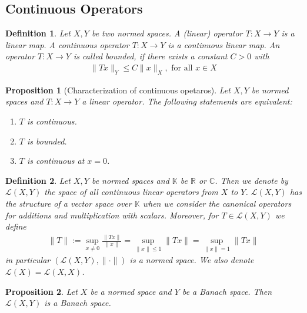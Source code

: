 \documentclass[11pt,a4paper]{article}
\newtheorem{prop}{Proposition}[section]
\newtheorem{defn}{Definition}[section]
\theoremstyle{definition}
\begin{document}
\subsection{Continuous Operators}
\begin{defn} Let $X,Y$ be two normed spaces. A (linear) operator $T: X \to Y$ is a linear map. A continuous operator $T:X \to Y$ is a continuous linear map. An operator $T: X \to Y$ is called bounded, if there exists a constant $C>0$ with 
\begin{align*}
\|Tx\|_Y \leq C \|x \|_X, \text{ for all } x \in X
\end{align*}
\end{defn}
\begin{prop}[Characterization of continuous opetaros] Let $X,Y$ be normed spaces and $T: X \to Y$ a linear operator. The following statements are equivalent:
\begin{enumerate}
\item $T$ is continuous.
\item $T$ is bounded.
\item $T$ is continuous at $x=0$. 
\end{enumerate}
\end{prop}
\begin{defn} Let $X,Y$ be normed spaces and $\mathbb{K}$ be $\mathbb{R}$ or $\mathbb{C}$. Then we denote by $\mathcal{L}(X,Y)$ the space of all continuous linear operators from $X$ to $Y$. $\mathcal{L}(X,Y)$ has the structure of a vector space over $\mathbb{K}$ when we consider the canonical operators for additions and multiplication with scalars. Moreover, for $T \in \mathcal{L}(X,Y)$ we define
\begin{align*}
\|T\| := \sup_{x \neq 0} \frac{\|Tx\|}{\|x\|}= \sup_{\|x \| \leq 1} \| Tx\| = \sup_{\|x\|=1} \|Tx\|
\end{align*}
in particular $(\mathcal{L}(X,Y), \| \cdot \|)$ is a normed space. We also denote $\mathcal{L}(X)=\mathcal{L}(X,X)$.
\end{defn}
\begin{prop} Let $X$ be a normed space and $Y$ be a Banach space. Then $\mathcal{L}(X,Y)$ is a Banach space. 
\end{prop}
\end{document}
